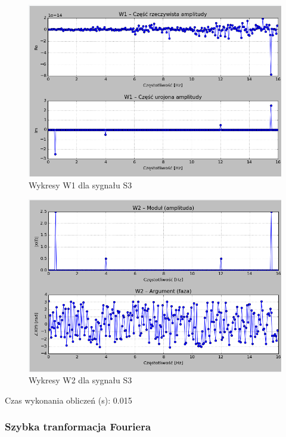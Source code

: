 \documentclass{article}
\begin{document}
{                \FloatBarrier
                \begin{figure}[h!]
                    \centering
                    \includegraphics[width=1\textwidth]{img/w1s3.png}
                    \caption{Wykresy W1 dla sygnału S3}
                \end{figure}

                \begin{figure}[h!]
                    \centering
                    \includegraphics[width=1\textwidth]{img/w2s3.png}
                    \caption{Wykresy W2 dla sygnału S3}
                \end{figure}
                \FloatBarrier

                Czas wykonania obliczeń (s): 0.015

        \subsubsection{Szybka tranformacja Fouriera}

}
\end{document}

